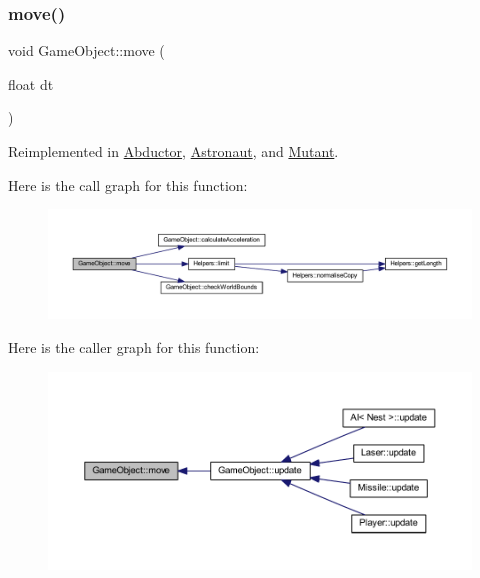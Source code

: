 \subsubsection{\texorpdfstring{move()}{move()}}
{\footnotesize\ttfamily void Game\+Object\+::move (\begin{DoxyParamCaption}\item[{float}]{dt }\end{DoxyParamCaption})\hspace{0.3cm}{\ttfamily [virtual]}}



Reimplemented in \hyperlink{class_abductor_a10bb137ba1b1707466f0a893052a0b30}{Abductor}, \hyperlink{class_astronaut_a763eea389d50440a049cd16d92c7c694}{Astronaut}, and \hyperlink{class_mutant_a5f5208a68bebe2cd3773f771a18e2992}{Mutant}.

Here is the call graph for this function\+:
\nopagebreak
\begin{figure}[H]
\begin{center}
\leavevmode
\includegraphics[width=350pt]{class_game_object_abebe08f70e334c52b8bf052b6ef8c6f3_cgraph}
\end{center}
\end{figure}
Here is the caller graph for this function\+:
\nopagebreak
\begin{figure}[H]
\begin{center}
\leavevmode
\includegraphics[width=350pt]{class_game_object_abebe08f70e334c52b8bf052b6ef8c6f3_icgraph}
\end{center}
\end{figure}
\mbox{\label{class_game_object_aa8edcc1e4f7c0e3fbc0bafeb2ab38086}} 
